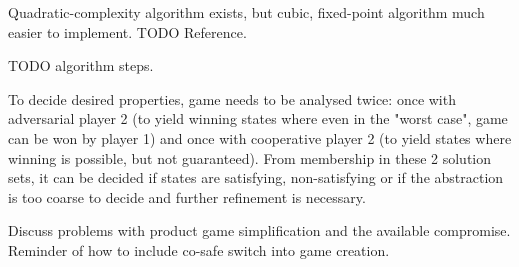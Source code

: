 Quadratic-complexity algorithm exists, but cubic, fixed-point algorithm much easier to implement.
TODO Reference.

TODO algorithm steps.

To decide desired properties, game needs to be analysed twice:
once with adversarial player 2 (to yield winning states where even in the "worst case", game can be won by player 1) and once with cooperative player 2 (to yield states where winning is possible, but not guaranteed).
From membership in these 2 solution sets, it can be decided if states are satisfying, non-satisfying or if the abstraction is too coarse to decide and further refinement is necessary.

Discuss problems with product game simplification and the available compromise.
Reminder of how to include co-safe switch into game creation.

